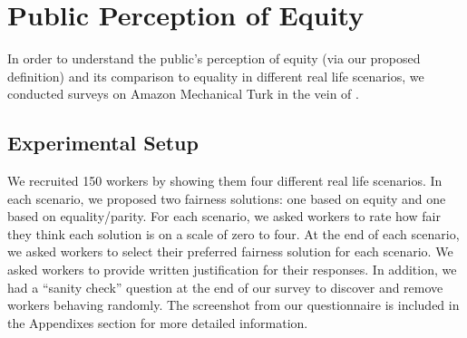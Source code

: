 \section{Public Perception of Equity}
In order to understand the public's perception of equity (via our proposed definition) and its comparison to equality in different real life scenarios, we conducted surveys on Amazon Mechanical Turk in the vein of \cite{saxena2019fairness}.

\subsection{Experimental Setup}
We recruited 150 workers by showing them four different real life scenarios. In each scenario, we proposed two fairness solutions: one based on equity and one based on equality/parity. For each scenario, we asked workers to rate how fair they think each solution is on a scale of zero to four. At the end of each scenario, we asked workers to select their preferred fairness solution for each scenario. We asked workers to provide written justification for their responses. In addition, we had a ``sanity check'' question at the end of our survey to discover and remove workers behaving randomly. The screenshot from our questionnaire is included in the Appendixes section for more detailed information.


